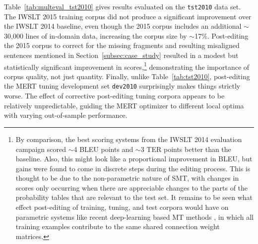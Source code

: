 {Table~\ref{tab:multeval_tst2010} gives results evaluated on the {\small \tt tst2010} data set.
The IWSLT 2015 training corpus did not produce a significant improvement over the IWSLT 2014 baseline, even though the 2015 corpus includes an additional $\sim$30,000 lines of in-domain data, increasing the corpus size by $\sim$17\%.
Post-editing the 2015 corpus to correct for the missing fragments and resulting misaligned sentences mentioned in Section~\ref{subsec:case_study} resulted in a modest but statistically significant improvement in scores,\footnote{
By comparison, the best scoring systems from the IWSLT 2014 evaluation campaign  scored $\sim$4 BLEU points and $\sim$3 TER points better than the baseline.
Also, this might look like a proportional improvement in BLEU, but gains were found to come in discrete steps during the editing process. 
This is thought to be due to the non-parametric nature of SMT, with changes in scores only occurring when there are appreciable changes to the parts of the probability tables that are relevant to the test set.
It remains to be seen what effect post-editing of training, tuning, and test corpora would have on parametric systems like recent deep-learning based MT methods , in which all training examples contribute to the same shared connection weight matrices.
} demonstrating the importance of corpus quality, not just quantity.
Finally, unlike Table~\ref{tab:tst2010}, post-editing the MERT tuning development set {\small \tt dev2010} surprisingly makes things strictly worse.
The effect of corrective post-editing tuning corpora appears to be relatively unpredictable, guiding the MERT optimizer to different local optima with varying out-of-sample performance.






}
